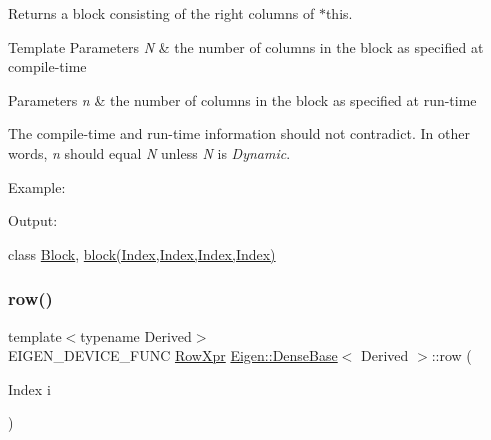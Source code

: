 \begin{DoxyReturn}{Returns}
a block consisting of the right columns of $\ast$this.
\end{DoxyReturn}

\begin{DoxyTemplParams}{Template Parameters}
{\em N} & the number of columns in the block as specified at compile-\/time \\
\hline
\end{DoxyTemplParams}

\begin{DoxyParams}{Parameters}
{\em n} & the number of columns in the block as specified at run-\/time\\
\hline
\end{DoxyParams}
The compile-\/time and run-\/time information should not contradict. In other words, {\itshape n} should equal {\itshape N} unless {\itshape N} is {\itshape Dynamic}.

Example\+: 
\begin{DoxyCodeInclude}{0}
\end{DoxyCodeInclude}
 Output\+: 
\begin{DoxyVerbInclude}
\end{DoxyVerbInclude}
 class \mbox{\hyperlink{class_eigen_1_1_block}{Block}}, \mbox{\hyperlink{class_eigen_1_1_dense_base_ab8e42e67c5cfd5fa13e684642f0f65bf}{block(\+Index,\+Index,\+Index,\+Index)}} \mbox{\label{class_eigen_1_1_dense_base_a4ea11afe36c7962c706caa93decd1380}} 
\subsubsection{\texorpdfstring{row()}{row()}}
{\footnotesize\ttfamily template$<$typename Derived$>$ \\
E\+I\+G\+E\+N\+\_\+\+D\+E\+V\+I\+C\+E\+\_\+\+F\+U\+NC \mbox{\hyperlink{class_eigen_1_1_block}{Row\+Xpr}} \mbox{\hyperlink{class_eigen_1_1_dense_base}{Eigen\+::\+Dense\+Base}}$<$ Derived $>$\+::row (\begin{DoxyParamCaption}\item[{Index}]{i }\end{DoxyParamCaption})\hspace{0.3cm}{\ttfamily [inline]}}

